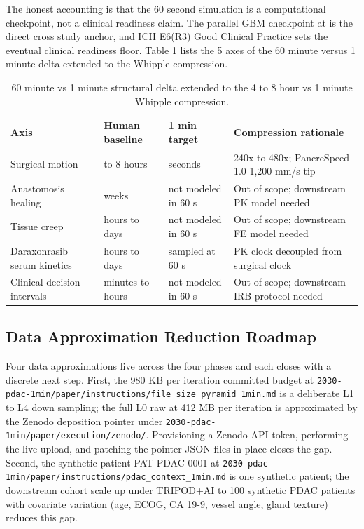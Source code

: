 The honest accounting is that the 60 second simulation is a
computational checkpoint, not a clinical readiness claim. The
parallel GBM checkpoint at \cite{kawchak_2026_20113157} is the
direct cross study anchor, and ICH E6(R3) Good Clinical Practice
\cite{ich-e6r3} sets the eventual clinical readiness floor.
Table \ref{tab:limits-time} lists the 5 axes of the 60 minute
versus 1 minute delta extended to the Whipple compression.

\begin{table}[H]
\caption{60 minute vs 1 minute structural delta extended to the 4 to 8 hour vs 1 minute Whipple compression.}
\label{tab:limits-time}
\centering
\begin{tabular}{>{\raggedright\arraybackslash}p{3.0cm} >{\raggedright\arraybackslash}p{3.4cm} >{\raggedright\arraybackslash}p{3.4cm} >{\raggedright\arraybackslash}p{4.0cm}}
\toprule
\textbf{Axis} & \textbf{Human baseline} & \textbf{1 min target} & \textbf{Compression rationale} \\
\midrule
  Surgical motion & 4 to 8 hours & 60 seconds & 240x to 480x; PancreSpeed 1.0 1,200 mm/s tip \\
  Anastomosis healing & weeks & not modeled in 60 s & Out of scope; downstream PK model needed \\
  Tissue creep & hours to days & not modeled in 60 s & Out of scope; downstream FE model needed \\
  Daraxonrasib serum kinetics & hours to days & sampled at 60 s & PK clock decoupled from surgical clock \\
  Clinical decision intervals & minutes to hours & not modeled in 60 s & Out of scope; downstream IRB protocol needed \\
\bottomrule
\end{tabular}
\end{table}

\subsection{Data Approximation Reduction Roadmap}
\label{sec:limits-data}

Four data approximations live across the four phases and each
closes with a discrete next step. First, the 980 KB per iteration
committed budget at
\texttt{2030-pdac-1min/paper/instructions/file_size_pyramid_1min.md}
is a deliberate L1 to L4 down sampling; the full L0 raw at 412 MB
per iteration is approximated by the Zenodo deposition pointer
under \texttt{2030-pdac-1min/paper/execution/zenodo/}. Provisioning
a Zenodo API token, performing the live upload, and patching the
pointer JSON files in place closes the gap. Second, the synthetic
patient PAT-PDAC-0001 at
\texttt{2030-pdac-1min/paper/instructions/pdac_context_1min.md} is
one synthetic patient; the downstream cohort scale up under
TRIPOD+AI \cite{Collins2024TRIPODAI} to 100 synthetic PDAC patients
with covariate variation (age, ECOG, CA 19-9, vessel angle, gland
texture) reduces this gap.

